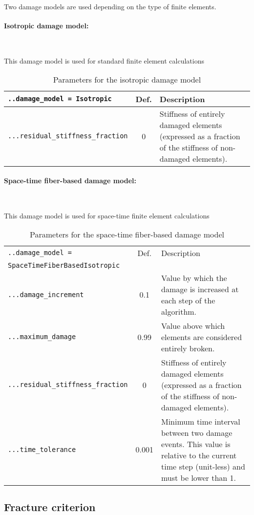 \documentclass[10pt]{article}
\newcommand{\whiteline}{\textcolor{white}{.\\}}
\begin{document}
Two damage models are used depending on the type of finite elements. 

\paragraph{Isotropic damage model:} \whiteline

This damage model is used for standard finite element calculations

\begin{table}[h!]
\begin{tabularx}{\textwidth}{lcX}
\verb+..damage_model = Isotropic+ & Def. & Description\\
\hline
\verb+...residual_stiffness_fraction+ & 0 & Stiffness of entirely damaged elements (expressed as a fraction of the stiffness of non-damaged elements).\\
\hline
\end{tabularx}
\caption{Parameters for the isotropic damage model}
\end{table}

\paragraph{Space-time fiber-based damage model:} \whiteline

This damage model is used for space-time finite element calculations

\begin{table}[h!]
\begin{tabularx}{\textwidth}{lcX}
\verb+..damage_model = + & Def. & Description\\
\verb+SpaceTimeFiberBasedIsotropic+ & & \\
\hline
\verb+...damage_increment+ & 0.1 & Value by which the damage is increased at each step of the algorithm.\\
\verb+...maximum_damage+ & 0.99 & Value above which elements are considered entirely broken.\\
\verb+...residual_stiffness_fraction+ & 0 & Stiffness of entirely damaged elements (expressed as a fraction of the stiffness of non-damaged elements).\\
\verb+...time_tolerance+ & 0.001 & Minimum time interval between two damage events. This value is relative to the current time step (unit-less) and must be lower than 1.\\
\hline
\end{tabularx}
\caption{Parameters for the space-time fiber-based damage model}
\end{table}

\subsection{Fracture criterion}
\end{document}
